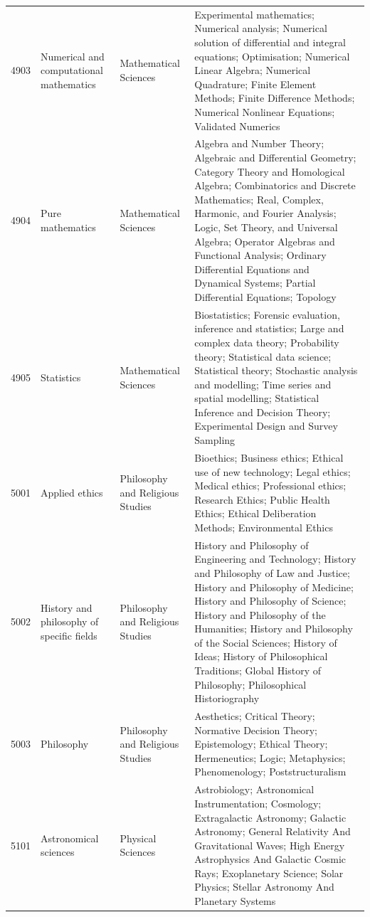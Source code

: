 \begin{longtable}{r p{2.45cm} p{2.55cm} p{6.15cm}}
4903 & Numerical and computational mathematics & Mathematical Sciences & Experimental mathematics; Numerical analysis; Numerical solution of differential and integral equations; Optimisation; Numerical Linear Algebra; Numerical Quadrature; Finite Element Methods; Finite Difference Methods; Numerical Nonlinear Equations; Validated Numerics \\
4904 & Pure mathematics & Mathematical Sciences & Algebra and Number Theory; Algebraic and Differential Geometry; Category Theory and Homological Algebra; Combinatorics and Discrete Mathematics; Real, Complex, Harmonic, and Fourier Analysis; Logic, Set Theory, and Universal Algebra; Operator Algebras and Functional Analysis; Ordinary Differential Equations and Dynamical Systems; Partial Differential Equations; Topology \\
4905 & Statistics & Mathematical Sciences & Biostatistics; Forensic evaluation, inference and statistics; Large and complex data theory; Probability theory; Statistical data science; Statistical theory; Stochastic analysis and modelling; Time series and spatial modelling; Statistical Inference and Decision Theory; Experimental Design and Survey Sampling \\
5001 & Applied ethics & Philosophy and Religious Studies & Bioethics; Business ethics; Ethical use of new technology; Legal ethics; Medical ethics; Professional ethics; Research Ethics; Public Health Ethics; Ethical Deliberation Methods; Environmental Ethics \\
5002 & History and philosophy of specific fields & Philosophy and Religious Studies & History and Philosophy of Engineering and Technology; History and Philosophy of Law and Justice; History and Philosophy of Medicine; History and Philosophy of Science; History and Philosophy of the Humanities; History and Philosophy of the Social Sciences; History of Ideas; History of Philosophical Traditions; Global History of Philosophy; Philosophical Historiography \\
5003 & Philosophy & Philosophy and Religious Studies & Aesthetics; Critical Theory; Normative Decision Theory; Epistemology; Ethical Theory; Hermeneutics; Logic; Metaphysics; Phenomenology; Poststructuralism \\
5101 & Astronomical sciences & Physical Sciences & Astrobiology; Astronomical Instrumentation; Cosmology; Extragalactic Astronomy; Galactic Astronomy; General Relativity And Gravitational Waves; High Energy Astrophysics And Galactic Cosmic Rays; Exoplanetary Science; Solar Physics; Stellar Astronomy And Planetary Systems \\

\end{longtable}
